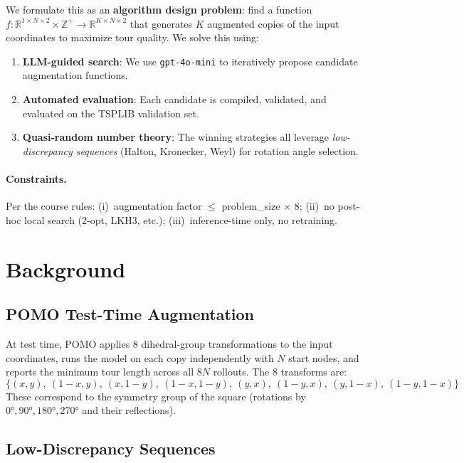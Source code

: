 \documentclass[11pt,a4paper]{article}
\begin{document}
We formulate this as an \textbf{algorithm design problem}: find a function
$f: \mathbb{R}^{1 \times N \times 2} \times \mathbb{Z}^+ \to \mathbb{R}^{K
\times N \times 2}$ that generates $K$ augmented copies of the input
coordinates to maximize tour quality. We solve this using:
\begin{enumerate}
  \item \textbf{LLM-guided search}: We use \texttt{gpt-4o-mini} to iteratively
        propose candidate augmentation functions.
  \item \textbf{Automated evaluation}: Each candidate is compiled, validated,
        and evaluated on the TSPLIB validation set.
  \item \textbf{Quasi-random number theory}: The winning strategies all
        leverage \emph{low-discrepancy sequences} (Halton, Kronecker, Weyl)
        for rotation angle selection.
\end{enumerate}

\paragraph{Constraints.} Per the course rules:
(i)~augmentation factor $\leq$ problem\_size $\times$ 8;
(ii)~no post-hoc local search (2-opt, LKH3, etc.);
(iii)~inference-time only, no retraining.

\section{Background}
\label{sec:bg}

\subsection{POMO Test-Time Augmentation}

At test time, POMO applies 8 dihedral-group transformations to the input
coordinates, runs the model on each copy independently with $N$ start nodes,
and reports the minimum tour length across all $8N$ rollouts. The 8
transforms are:
\[
  \{(x,y),\ (1{-}x,y),\ (x,1{-}y),\ (1{-}x,1{-}y),\ (y,x),\ (1{-}y,x),\ (y,1{-}x),\ (1{-}y,1{-}x)\}
\]
These correspond to the symmetry group of the square (rotations by
$0°, 90°, 180°, 270°$ and their reflections).

\subsection{Low-Discrepancy Sequences}
\end{document}
